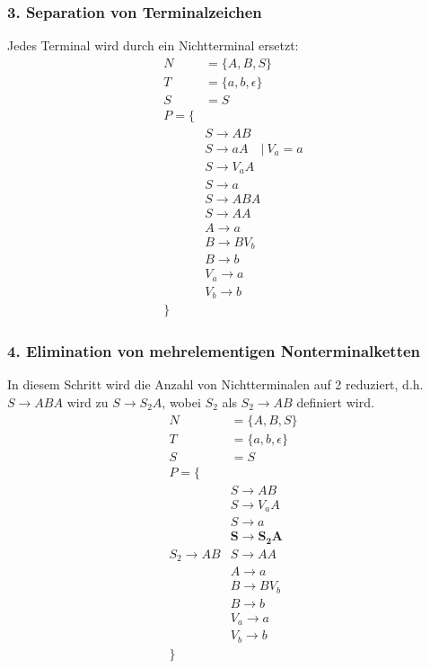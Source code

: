 \documentclass[12pt, oneside]{book}
\begin{document}
\subsubsection{3. Separation von Terminalzeichen}
Jedes Terminal wird durch ein Nichtterminal ersetzt:
\begin{align*}
    N&=\{A,B,S\}\\
    T&=\{a,b,\epsilon\}\\
    S&=S\\
    P=\{\\
    &S\to AB\\
    &S\to aA \quad |\ V_a = a\\
    &S\to V_{a}A\\
    &S\to a\\
    &S\to ABA\\
    &S\to AA\\
    &A\to a\\
    &B\to BV_b\\
    &B\to b\\
    &V_a\to a\\
    &V_b\to b\\
    \}
\end{align*}
\subsubsection{4. Elimination von mehrelementigen Nonterminalketten}
In diesem Schritt wird die Anzahl von Nichtterminalen auf 2 reduziert, d.h. $S\to ABA$ wird zu $S\to S_2A$, wobei $S_2$ als $S_2\to AB$ definiert wird.
\begin{align*}
    N&=\{A,B,S\}\\
    T&=\{a,b,\epsilon\}\\
    S&=S\\
    P=\{\\
    &S\to AB\\
    &S\to V_{a}A\\
    &S\to a\\
    &\mathbf{S\to S_2A}\\
    S_2\to AB
    &S\to AA\\
    &A\to a\\
    &B\to BV_b\\
    &B\to b\\
    &V_a\to a\\
    &V_b\to b\\
    \}
\end{align*}
\fi
\end{document}
